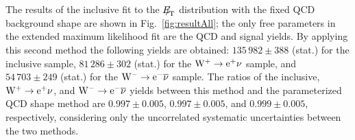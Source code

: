 The results of the inclusive fit to the ${E\!\!\!/}_{\!\mathrm{T}}$ distribution with the fixed QCD background shape
are shown in Fig.~\ref{fig:resultAll}; the only free parameters in the extended 
maximum likelihood fit are the QCD and signal yields.
By applying this second method the following yields are obtained:
$135\,982 \pm 388$ (stat.) for the inclusive sample, $81\,286 \pm 302$ (stat.) for the $\mathrm{W^+} \rightarrow \mathrm{e}^+\nu$ sample, and
$54\,703 \pm 249$ (stat.) for the $\mathrm{W^-} \rightarrow \mathrm{e}^-\overline{\nu}$ sample.
The ratios of the inclusive, $\mathrm{W^+} \rightarrow \mathrm{e}^+\nu$, and $\mathrm{W^-} \rightarrow \mathrm{e}^-\overline{\nu}$ yields between this 
method and the parameterized
QCD shape method are $0.997 \pm 0.005$, $0.997 \pm 0.005$, and $0.999 \pm 0.005$, respectively, 
considering only the uncorrelated systematic uncertainties between the two methods.

